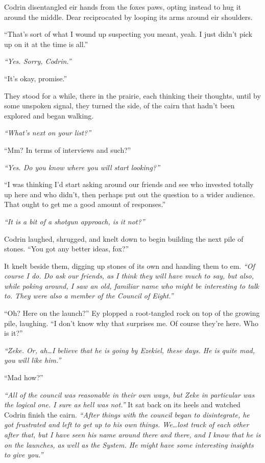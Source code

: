 Codrin disentangled eir hands from the foxes paws, opting instead to hug it around the middle. Dear reciprocated by looping its arms around eir shoulders.

``That's sort of what I wound up suspecting you meant, yeah. I just didn't pick up on it at the time is all.''

\emph{``Yes. Sorry, Codrin.''}

``It's okay, promise.''

They stood for a while, there in the prairie, each thinking their thoughts, until by some unspoken signal, they turned the side, of the cairn that hadn't been explored and began walking.

\emph{``What's next on your list?''}

``Mm? In terms of interviews and such?''

\emph{``Yes. Do you know where you will start looking?''}

``I was thinking I'd start asking around our friends and see who invested totally up here and who didn't, then perhaps put out the question to a wider audience. That ought to get me a good amount of responses.''

\emph{``It is a bit of a shotgun approach, is it not?''}

Codrin laughed, shrugged, and knelt down to begin building the next pile of stones. ``You got any better ideas, fox?''

It knelt beside them, digging up stones of its own and handing them to em. \emph{``Of course I do. Do ask our friends, as I think they will have much to say, but also, while poking around, I saw an old, familiar name who might be interesting to talk to. They were also a member of the Council of Eight.''}

``Oh? Here on the launch?'' Ey plopped a root-tangled rock on top of the growing pile, laughing. ``I don't know why that surprises me. Of course they're here. Who is it?''

\emph{``Zeke. Or, ah\ldots I believe that he is going by Ezekiel, these days. He is quite mad, you will like him.''}

``Mad how?''

\emph{``All of the council was reasonable in their own ways, but Zeke in particular was the logical one. I sure as hell was not.''} It sat back on its heels and watched Codrin finish the cairn. \emph{``After things with the council began to disintegrate, he got frustrated and left to get up to his own things. We\ldots lost track of each other after that, but I have seen his name around there and there, and I know that he is on the launches, as well as the System. He might have some interesting insights to give you.''}

